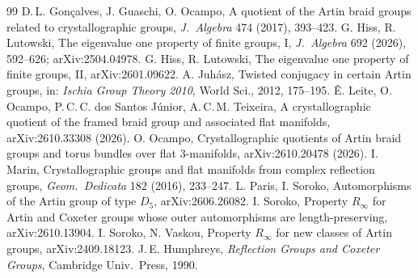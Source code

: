 \documentclass[11pt]{amsart}
\theoremstyle{definition}
\begin{document}
\begin{thebibliography}{99}
 D.\,L. Gon\c{c}alves, J. Guaschi, O. Ocampo, A quotient of the Artin braid groups related to crystallographic groups, \emph{J.\ Algebra} 474 (2017), 393--423.
 G. Hiss, R. Lutowski, The eigenvalue one property of finite groups, I, \emph{J.\ Algebra} 692 (2026), 592--626; arXiv:2504.04978.
 G. Hiss, R. Lutowski, The eigenvalue one property of finite groups, II, arXiv:2601.09622.
 A. Juh\'asz, Twisted conjugacy in certain Artin groups, in: \emph{Ischia Group Theory 2010}, World Sci., 2012, 175--195.
 \^E. Leite, O. Ocampo, P.\,C.\,C. dos Santos J\'unior, A.\,C.\,M. Teixeira, A crystallographic quotient of the framed braid group and associated flat manifolds, arXiv:2610.33308 (2026).
 O. Ocampo, Crystallographic quotients of Artin braid groups and torus bundles over flat $3$-manifolds, arXiv:2610.20478 (2026).
 I. Marin, Crystallographic groups and flat manifolds from complex reflection groups, \emph{Geom.\ Dedicata} 182 (2016), 233--247.
 L. Paris, I. Soroko, Automorphisms of the Artin group of type $D_5$, arXiv:2606.26082.
 I. Soroko, Property $R_\infty$ for Artin and Coxeter groups whose outer automorphisms are length-preserving, arXiv:2610.13904.
 I. Soroko, N. Vaskou, Property $R_\infty$ for new classes of Artin groups, arXiv:2409.18123.
 J.\,E. Humphreys, \emph{Reflection Groups and Coxeter Groups}, Cambridge Univ.\ Press, 1990.
\end{thebibliography}
\end{document}
